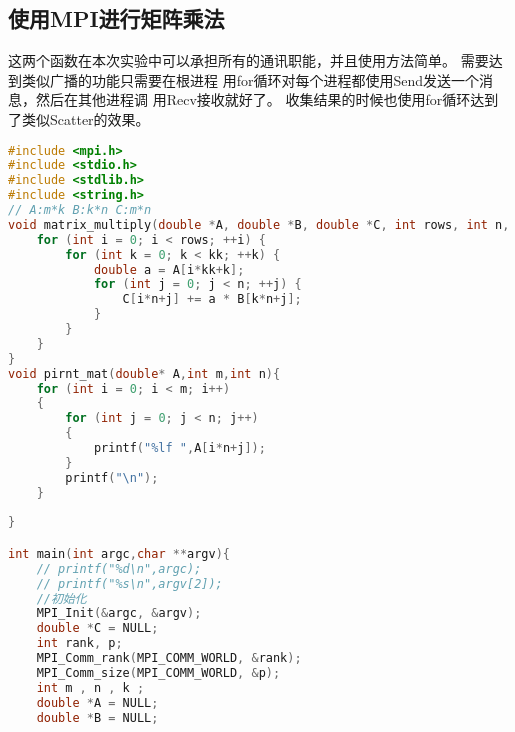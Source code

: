 \documentclass{SYSUReport}
\begin{document}
\subsection{使用MPI进行矩阵乘法}
这两个函数在本次实验中可以承担所有的通讯职能，并且使用方法简单。
需要达到类似广播的功能只需要在根进程
用for循环对每个进程都使用Send发送一个消息，然后在其他进程调
用Recv接收就好了。
收集结果的时候也使用for循环达到了类似Scatter的效果。
\begin{lstlisting}[language=c++]
#include <mpi.h>
#include <stdio.h>
#include <stdlib.h>
#include <string.h>
// A:m*k B:k*n C:m*n
void matrix_multiply(double *A, double *B, double *C, int rows, int n, int kk) {
    for (int i = 0; i < rows; ++i) {          
        for (int k = 0; k < kk; ++k) {     
            double a = A[i*kk+k];                
            for (int j = 0; j < n; ++j) {  
                C[i*n+j] += a * B[k*n+j];   
            }
        }
    }
}
void pirnt_mat(double* A,int m,int n){
    for (int i = 0; i < m; i++)
    {
        for (int j = 0; j < n; j++)
        {
            printf("%lf ",A[i*n+j]);
        }
        printf("\n");
    }
    
}

int main(int argc,char **argv){
    // printf("%d\n",argc);
    // printf("%s\n",argv[2]);
    //初始化
    MPI_Init(&argc, &argv);
    double *C = NULL;
    int rank, p;
    MPI_Comm_rank(MPI_COMM_WORLD, &rank);
    MPI_Comm_size(MPI_COMM_WORLD, &p);
    int m , n , k ; 
    double *A = NULL;
    double *B = NULL;
    

\end{lstlisting}
\end{document}
